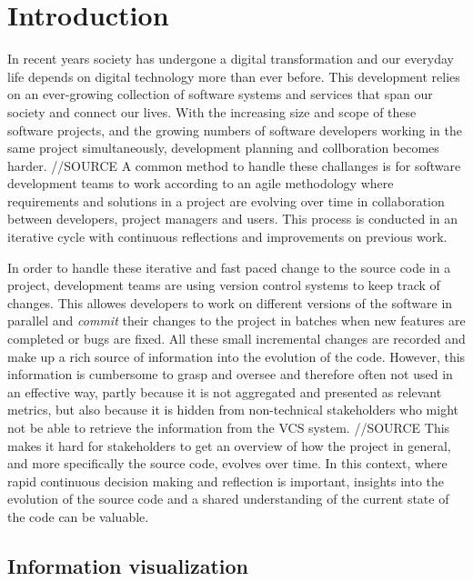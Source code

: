 

\section{Introduction}
In recent years society has undergone a digital transformation and our everyday life depends on digital technology more than ever before. 
This development relies on an ever-growing collection of software systems and services that span our society and connect our lives. 
With the increasing size and scope of these software projects, and the growing numbers of software developers working in the same project simultaneously, development planning and collboration becomes harder. //SOURCE
A common method to handle these challanges is for software development teams to work according to an agile methodology \cite{hazzan_agile_2014} where requirements and solutions in a project are evolving over time in collaboration between developers, project managers and users. 
This process is conducted in an iterative cycle with continuous reflections and improvements on previous work.

In order to handle these iterative and fast paced change to the source code in a project, development teams are using version control systems to keep track of changes. 
This allowes developers to work on different versions of the software in parallel and \textit{commit} their changes to the project in batches when new features are completed or bugs are fixed.
All these small incremental changes are recorded and make up a rich source of information into the evolution of the code. 
However, this information is cumbersome to grasp and oversee and therefore often not used in an effective way, partly because it is not aggregated and presented as relevant metrics, but also because it is hidden from non-technical stakeholders who might not be able to retrieve the information from the VCS system. //SOURCE
This makes it hard for stakeholders to get an overview of how the project in general, and more specifically the source code, evolves over time.
In this context, where rapid continuous decision making and reflection is important, insights into the evolution of the source code and a shared understanding of the current state of the code can be valuable. \cite{ball_if_1997}

\subsection{Information visualization}




